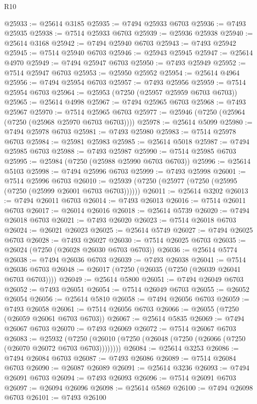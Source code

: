 \begin{lexlean}{R10}
\begin{coremodule}
@25933 := @25614 @3185
@25935 := @7494 @25933 @6703
@25936 := @7493 @25935
@25938 := @7514 @25933 @6703
@25939 := @25936 @25938
@25940 := @25614 @3168
@25942 := @7494 @25940 @6703
@25943 := @7493 @25942
@25945 := @7514 @25940 @6703
@25946 := @25943 @25945
@25947 := @25614 @4970
@25949 := @7494 @25947 @6703
@25950 := @7493 @25949
@25952 := @7514 @25947 @6703
@25953 := @25950 @25952
@25954 := @25614 @4964
@25956 := @7494 @25954 @6703
@25957 := @7493 @25956
@25959 := @7514 @25954 @6703
@25964 := @25953 (@7250 (@25957 @25959 @6703 @6703))
@25965 := @25614 @4998
@25967 := @7494 @25965 @6703
@25968 := @7493 @25967
@25970 := @7514 @25965 @6703
@25977 := @25946 (@7250 (@25964 (@7250 (@25968 @25970 @6703 @6703))))
@25978 := @25614 @5099
@25980 := @7494 @25978 @6703
@25981 := @7493 @25980
@25983 := @7514 @25978 @6703
@25984 := @25981 @25983
@25985 := @25614 @5018
@25987 := @7494 @25985 @6703
@25988 := @7493 @25987
@25990 := @7514 @25985 @6703
@25995 := @25984 (@7250 (@25988 @25990 @6703 @6703))
@25996 := @25614 @5103
@25998 := @7494 @25996 @6703
@25999 := @7493 @25998
@26001 := @7514 @25996 @6703
@26010 := @25939 (@7250 (@25977 (@7250 (@25995 (@7250 (@25999 @26001 @6703 @6703))))))
@26011 := @25614 @3202
@26013 := @7494 @26011 @6703
@26014 := @7493 @26013
@26016 := @7514 @26011 @6703
@26017 := @26014 @26016
@26018 := @25614 @5739
@26020 := @7494 @26018 @6703
@26021 := @7493 @26020
@26023 := @7514 @26018 @6703
@26024 := @26021 @26023
@26025 := @25614 @5749
@26027 := @7494 @26025 @6703
@26028 := @7493 @26027
@26030 := @7514 @26025 @6703
@26035 := @26024 (@7250 (@26028 @26030 @6703 @6703))
@26036 := @25614 @5774
@26038 := @7494 @26036 @6703
@26039 := @7493 @26038
@26041 := @7514 @26036 @6703
@26048 := @26017 (@7250 (@26035 (@7250 (@26039 @26041 @6703 @6703))))
@26049 := @25614 @5800
@26051 := @7494 @26049 @6703
@26052 := @7493 @26051
@26054 := @7514 @26049 @6703
@26055 := @26052 @26054
@26056 := @25614 @5810
@26058 := @7494 @26056 @6703
@26059 := @7493 @26058
@26061 := @7514 @26056 @6703
@26066 := @26055 (@7250 (@26059 @26061 @6703 @6703))
@26067 := @25614 @5835
@26069 := @7494 @26067 @6703
@26070 := @7493 @26069
@26072 := @7514 @26067 @6703
@26083 := @25932
    (@7250 (@26010 (@7250 (@26048 (@7250 (@26066 (@7250 (@26070 @26072 @6703 @6703))))))))
@26084 := @25614 @3253
@26086 := @7494 @26084 @6703
@26087 := @7493 @26086
@26089 := @7514 @26084 @6703
@26090 := @26087 @26089
@26091 := @25614 @3236
@26093 := @7494 @26091 @6703
@26094 := @7493 @26093
@26096 := @7514 @26091 @6703
@26097 := @26094 @26096
@26098 := @25614 @5869
@26100 := @7494 @26098 @6703
@26101 := @7493 @26100

\end{coremodule}
\end{lexlean}
